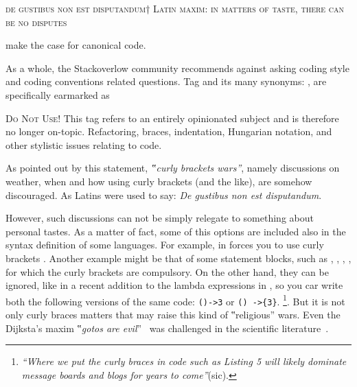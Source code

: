 \textsc{de gustibus non est disputandum†{%
    Latin maxim: in matters of taste, there can be no disputes
}}

make the case for canonical code.

As a whole, the Stackoverlow community
recommends against asking coding style and coding conventions related questions.
Tag  and its many synonyms: ,
 are specifically
earmarked as

\begin{tcolorbox}[colback=green!5!white,colframe=blue!25!white,notitle]
    \textsc{Do Not Use!}
This tag refers to an entirely opinionated subject and is therefore
no longer on-topic. Refactoring, braces, indentation, Hungarian notation, and
other stylistic issues relating to code.
\end{tcolorbox}

As pointed out by this statement, \emph{‟curly brackets wars”}, namely discussions
on weather, when and how using curly brackets (and the like), are somehow discouraged.
As Latins were used to say: \emph{De gustibus non est disputandum}.

However, such discussions can not be simply relegate to something about personal
tastes. 
As a matter of fact, some of this options are included also in the syntax definition of some languages.
For example, in \Go forces you to use curly brackets .
Another example might be that of some \Java statement blocks, such as , , ,
, for which the curly brackets are compulsory.
On the other hand, they can be ignored, like in a recent addition to
the lambda expressions 
in \Java, so you car write both the following versions of the same code: \texttt{()->3} or \texttt{() ->\{3\}}.
\footnote{%
\emph{``Where we put the curly braces in code such as Listing 5 will likely dominate \Java message boards and blogs for years to come''}(sic).
}.
But it is not only curly braces matters that may raise
this kind of ‟religious” wars. Even the Dijksta's maxim ‟\emph{gotos are evil}”~\cite{Dijkstra:68} 
was challenged in the scientific literature~\cite{Knuth:74,Ramshaw:88,Bochmann:73,Sennesh:Gil:16,Zoethout:79,Wulf:79,Clark:84}.

